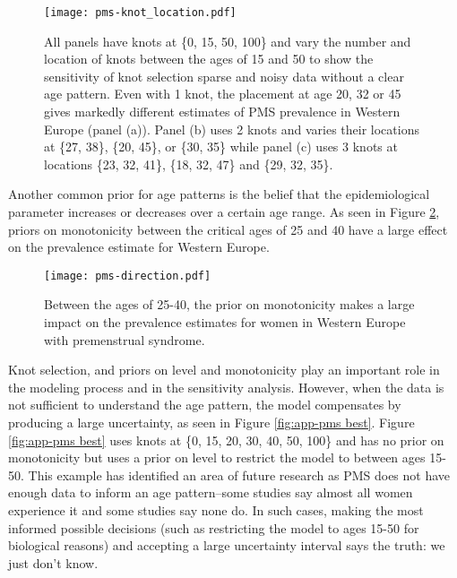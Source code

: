     \begin{figure}
        \begin{center}
            \texttt{[image: pms-knot\_location.pdf]}
        \end{center}
        \caption{All panels have knots at \{0, 15, 50, 100\} and vary
          the number and location of knots between the ages of 15 and
          50 to show the sensitivity of knot selection sparse and
          noisy data without a clear age pattern. Even with 1 knot,
          the placement at age 20, 32 or 45 gives markedly different
          estimates of PMS prevalence in Western Europe (panel (a)).
          Panel (b) uses 2 knots and varies their locations at \{27,
          38\}, \{20, 45\}, or \{30, 35\} while panel (c) uses 3 knots
          at locations \{23, 32, 41\}, \{18, 32, 47\} and \{29, 32,
          35\}.}
        \label{fig:app-pms knot_loc}
    \end{figure}

Another common prior for age patterns is the belief that the
epidemiological parameter increases or decreases over a certain age
range.  As seen in Figure \ref{fig:app-pms dir}, priors on
monotonicity between the critical ages of 25 and 40 have a large
effect on the prevalence estimate for Western Europe.

    \begin{figure}
        \begin{center}
            \texttt{[image: pms-direction.pdf]}
        \end{center}
        \caption{Between the ages of 25-40, the prior on monotonicity
          makes a large impact on the prevalence estimates for women
          in Western Europe with premenstrual syndrome.}
        \label{fig:app-pms dir}
    \end{figure}

Knot selection, and priors on level and monotonicity play an important
role in the modeling process and in the sensitivity analysis.  However,
when the data is not sufficient to understand the age pattern, the
model compensates by producing a large uncertainty, as seen in
Figure \ref{fig:app-pms best}.  Figure \ref{fig:app-pms best} uses knots
at \{0, 15, 20, 30, 40, 50, 100\} and has no prior on monotonicity but
uses a prior on level to restrict the model to between ages 15-50.  This
example has identified an area of future research as PMS does not have enough
data to inform an age pattern--some studies say almost all women experience
it and some studies say none do.  In such cases, making the most informed
possible decisions (such as restricting the model to ages 15-50 for biological
reasons) and accepting a large uncertainty interval says the truth: we just don't know.

